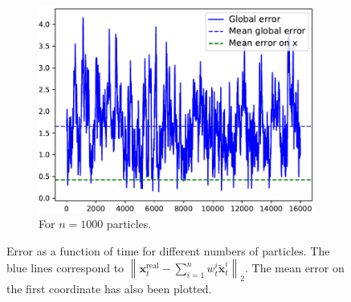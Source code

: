\documentclass[english, DIV=13]{scrartcl}
\newcommand\norm[1]{\left\lVert#1\right\rVert}
\begin{document}
\begin{figure}
\begin{subfigure}{0.49\textwidth}
        \includegraphics[width=\textwidth]{figures/error-1000}
        \caption{For $n=1000$ particles.} 
        \label{fig:q3-error-1000}
    \end{subfigure}
    \caption{Error as a function of time for different numbers of particles. The blue
    lines correspond to $\norm{\mathbf{x}_t^{\text{real}} - \sum_{i=1}^n
    w_t^i\tilde{\mathbf{x}}_t^i}_2$.
    The mean error on the first coordinate has also been plotted.}
\end{figure}
\end{document}
